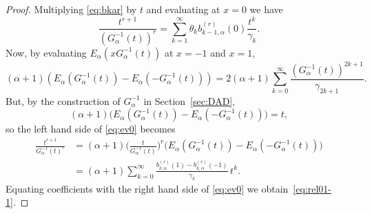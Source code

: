 \documentclass[11pt]{article}
\theoremstyle{plain}
\theoremstyle{remark}
\numberwithin{equation}{section} %
\newcommand{\Ea}{E_{\alpha}}
\newcommand{\cc}{\gamma}
\begin{document}
\begin{proof}
Multiplying \eqref{eq:bkar} by $t$ and evaluating at $x=0$ we have
\begin{equation}
\label{eq:ev0}
\frac{t^{r+1}}{(G_{\alpha}^{-1}(t))^r}
= \sum_{k=1}^{\infty} \theta_k b_{k-1,\alpha}^{(r)}(0) \frac{t^k}{\cc_k}.
\end{equation}
Now, by evaluating $\Ea(xG_{\alpha}^{-1}(t))$ at $x=-1$ and $x=1$, 
$$
(\alpha+1) \left(\Ea(G_{\alpha}^{-1}(t))-\Ea(-G_{\alpha}^{-1}(t))\right)
= 2(\alpha+1) \sum_{k=0}^{\infty} \frac{(G_{\alpha}^{-1}(t))^{2k+1}}{\cc_{2k+1}}.
$$
But, by the construction of $G_{\alpha}^{-1}$ in Section~\ref{sec:DAD},
\[
(\alpha+1) \big(\Ea(G_{\alpha}^{-1}(t))-\Ea(-G_{\alpha}^{-1}(t))\big) = t,
\]
so the left hand side of \eqref{eq:ev0} becomes
\begin{align*}
\frac{t^{r+1}}{G_{\alpha}^{-1}(t)^r}
&= (\alpha+1) \bigg(\frac{t}{G_{\alpha}^{-1}(t)}\bigg)^r 
\big(\Ea(G_{\alpha}^{-1}(t))-\Ea(-G_{\alpha}^{-1}(t))\big) \\
&= (\alpha+1) \sum_{k=0}^{\infty} \frac{b_{k,\alpha}^{(r)}(1)-b_{k,\alpha}^{(r)}(-1)}{\cc_k} \,t^k.
\end{align*}
Equating coefficients with the right hand side of \eqref{eq:ev0} we obtain~\eqref{eq:rel01-1}.
\end{proof}
\end{document}
